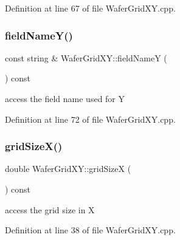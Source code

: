 Definition at line 67 of file Wafer\+Grid\+X\+Y.\+cpp.

\hypertarget{class_d_d4hep_1_1_geometry_1_1_wafer_grid_x_y_a396ef50a82a36b0a872193f8bc7c927e}{}\label{class_d_d4hep_1_1_geometry_1_1_wafer_grid_x_y_a396ef50a82a36b0a872193f8bc7c927e} 
\subsubsection{\texorpdfstring{field\+Name\+Y()}{fieldNameY()}}
{\footnotesize\ttfamily const string \& Wafer\+Grid\+X\+Y\+::field\+NameY (\begin{DoxyParamCaption}{ }\end{DoxyParamCaption}) const}



access the field name used for Y 



Definition at line 72 of file Wafer\+Grid\+X\+Y.\+cpp.

\hypertarget{class_d_d4hep_1_1_geometry_1_1_wafer_grid_x_y_a5a5b9f5a36decd58ed029469d8b503ac}{}\label{class_d_d4hep_1_1_geometry_1_1_wafer_grid_x_y_a5a5b9f5a36decd58ed029469d8b503ac} 
\subsubsection{\texorpdfstring{grid\+Size\+X()}{gridSizeX()}}
{\footnotesize\ttfamily double Wafer\+Grid\+X\+Y\+::grid\+SizeX (\begin{DoxyParamCaption}{ }\end{DoxyParamCaption}) const}



access the grid size in X 



Definition at line 38 of file Wafer\+Grid\+X\+Y.\+cpp.

\hypertarget{class_d_d4hep_1_1_geometry_1_1_wafer_grid_x_y_a3f50027f933a814afa1005bb75bb9f61}{}\label{class_d_d4hep_1_1_geometry_1_1_wafer_grid_x_y_a3f50027f933a814afa1005bb75bb9f61} 

